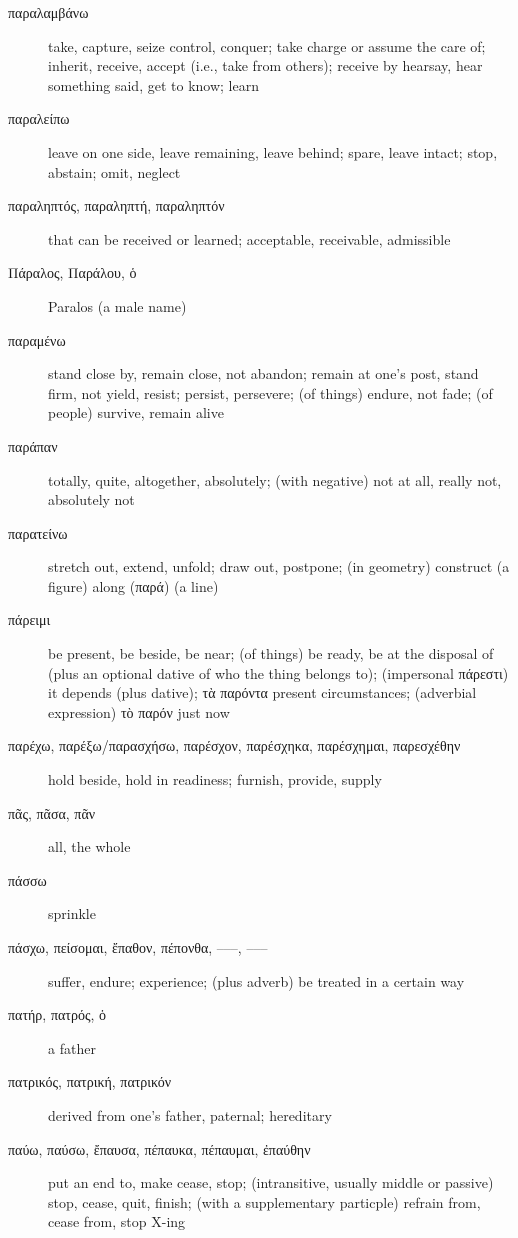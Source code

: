 \documentclass[12pt,letterpaper]{article}
\begin{document}
\begin{description}
    \item[\textgreek{παραλαμβάνω}] take, capture, seize control, conquer; take charge or assume the care of; inherit, receive, accept (i.e., take from others); receive by hearsay, hear something said, get to know; learn
    \item[\textgreek{παραλείπω}] leave on one side, leave remaining, leave behind; spare, leave intact; stop, abstain; omit, neglect
    \item[\textgreek{παραληπτός, παραληπτή, παραληπτόν}] that can be received or learned; acceptable, receivable, admissible
    \item[\textgreek{Πάραλος, Παράλου, ὁ}] Paralos (a male name)
    \item[\textgreek{παραμένω}] stand close by, remain close, not abandon; remain at one's post, stand firm, not yield, resist; persist, persevere; (of things) endure, not fade; (of people) survive, remain alive
    \item[\textgreek{παράπαν}] totally, quite, altogether, absolutely; (with negative) not at all, really not, absolutely not
    \item[\textgreek{παρατείνω}] stretch out, extend, unfold; draw out, postpone; (in geometry) construct (a figure) along (\textgreek{παρά}) (a line)
    \item[\textgreek{πάρειμι}] \marginnote{*}be present, be beside, be near; (of things) be ready, be at the disposal of (plus an optional dative of who the thing belongs to); (impersonal πάρεστι) it depends (plus dative); τὰ παρόντα present circumstances; (adverbial expression) τὸ παρόν just now
    \item[\textgreek{παρέχω, παρέξω/παρασχήσω, παρέσχον, παρέσχηκα, παρέσχημαι, παρεσχέθην}] \marginnote{*}hold beside, hold in readiness; furnish, provide, supply
    \item[\textgreek{πᾶς, πᾶσα, πᾶν}] \marginnote{*}all, the whole
    \item[\textgreek{πάσσω}] sprinkle
    \item[\textgreek{πάσχω, πείσομαι, ἔπαθον, πέπονθα, –––, –––}] \marginnote{*}suffer, endure; experience; (plus adverb) be treated in a certain way
    \item[\textgreek{πατήρ, πατρός, ὁ}] \marginnote{*}a father
    \item[\textgreek{πατρικός, πατρική, πατρικόν}] derived from one's father, paternal; hereditary
    \item[\textgreek{παύω, παύσω, ἔπαυσα, πέπαυκα, πέπαυμαι, ἐπαύθην}] \marginnote{*}put an end to, make cease, stop; (intransitive, usually middle or passive) stop, cease, quit, finish; (with a supplementary particple) refrain from, cease from, stop X-ing

\end{description}
\end{document}
